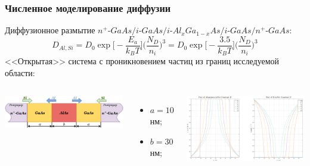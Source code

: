 \documentclass[10pt,pdf,hyperref={unicode},aspectratio={169}]{beamer}
\begin{document}
\begin{frame}
	\frametitle{Численное моделирование диффузии}
	Диффузионное размытие {\color{blue} $n^{+}$-$GaAs/i$-$GaAs/i$-$Al_{x}Ga_{1-x}As/i$-$GaAs/n^{+}$-$GaAs$}:
	\begin{equation*}
		D_{Al,Si} = D_{0}\exp\bigg[-\frac{E_{a}}{k_{B}T}\bigg]\Big( \frac{N_{D}}{n_{i}} \Big)^{3} = D_{0}\exp\bigg[-\frac{3.5}{k_{B}T}\bigg]\Big( \frac{N_{D}}{n_{i}} \Big)^{3}
	\end{equation*}
	{\color{red}<<Открытая>> система с проникновением частиц из границ исследуемой области:}\\
	\centering
\begin{columns}
   	\includegraphics[width=\linewidth]{assets/DSiBox}
   	\begin{itemize}
   		\item $a = 10$ нм;
   		\item $b = 30$ нм;
   	\end{itemize}
   	\includegraphics[width=\linewidth]{assets/DSi}
\end{columns}
\end{frame}
\end{document}
